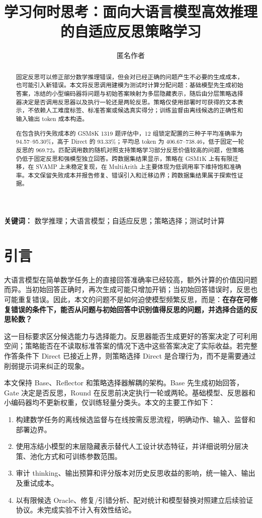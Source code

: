 \documentclass[11pt]{article}
\title{学习何时思考：面向大语言模型高效推理的自适应反思策略学习}
\author{匿名作者}
\begin{document}
\maketitle
\begin{abstract}
固定反思可以修正部分数学推理错误，但会对已经正确的问题产生不必要的生成成本，也可能引入新错误。本文将反思调用建模为测试时计算分配问题：基础模型先生成初始答案，冻结的小型编码器将问题与初始答案映射为多层隐藏表示，随后由分层策略选择器决定是否调用反思器以及执行一轮还是两轮反思。策略仅使用部署时可获得的文本表示，不依赖人工难度标签、标准答案或候选真实得分；训练监督由离线候选的正确性和输入输出 token 成本构造。

在包含执行失败成本的 GSM8K 1319 题评估中，12 组锁定配置的三种子平均准确率为 94.57--95.30\%，高于 Direct 的 93.33\%；平均总 token 为 406.67--738.46，低于固定一轮反思的 969.72。匹配调用数的随机对照支持策略学习部分反思价值较高的问题，但策略仍低于固定反思和强模型独立回答。跨数据集结果显示，策略在 GSM1K 上有有限迁移，在 SVAMP 上未稳定复现，在 MultiArith 上主要体现为低调用率下维持饱和准确率。本文保留失败成本并报告修复、错误引入和迁移边界；跨数据集结果属于探索性证据。
\end{abstract}
\noindent\textbf{关键词：} 数学推理；大语言模型；自适应反思；策略选择；测试时计算

\section{引言}
大语言模型在简单数学任务上的直接回答准确率已经较高，额外计算的价值因问题而异。当初始回答正确时，再次生成可能只增加开销；当初始回答错误时，反思也可能重复错误。因此，本文的问题不是如何迫使模型频繁反思，而是：\textbf{在存在可修复错误的条件下，能否从问题与初始回答中识别值得反思的问题，并选择合适的反思轮数？}

这一目标要求区分候选能力与选择能力。反思器能否生成更好的答案决定了可利用空间；策略能否在不读取标准答案的情况下选中这些答案决定了实际收益。若完整作答条件下 Direct 已接近上界，则策略选择 Direct 是合理行为，而不是需要通过削弱提示词来纠正的现象。

本文保持 Base、Reflector 和策略选择器解耦的架构。Base 先生成初始回答，Gate 决定是否反思，Round 在反思前决定执行一轮或两轮。基础模型、反思器和小编码器均不更新权重，仅训练轻量分类头。本文的主要工作如下：
\begin{enumerate}
\item 构建数学任务的离线候选监督与在线按需反思流程，明确动作、输入、监督和部署边界。
\item 使用冻结小模型的末层隐藏表示替代人工设计状态特征，并详细说明分层决策、池化方式和可训练参数范围。
\item 审计 thinking、输出预算和评分版本对历史反思收益的影响，统一输入、输出及重试成本。
\item 以有限候选 Oracle、修复/引错分析、配对统计和模型替换对照建立后续验证协议。未完成实验不计入有效性结论。
\end{enumerate}
\end{document}

